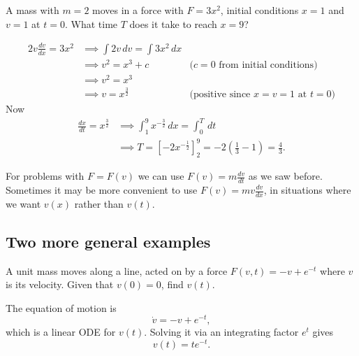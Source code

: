\documentclass[10pt, a4paper]{article}
\begin{document}
\begin{example}
    A mass with $m = 2$ moves in a force with $F = 3x ^ 2$,
    initial conditions $x = 1$ and $v = 1$ at $t = 0$.
    What time $T$ does it take to reach $x = 9$?

    \begin{solution}
        \begin{align*}
            2v\frac{dv}{dx} = 3x ^ 2 &\implies \int 2v\,dv = \int 3x ^ 2\,dx \\
            &\implies v ^ 2 = x ^ 3 + c &\text{($c = 0$ from initial conditions)} \\
            &\implies v ^ 2 = x ^ 3 \\
            &\implies v = x ^ {\frac{3}{2}} &\text{(positive since $x = v = 1$ at $t = 0$)}
        \end{align*}
        Now
        \begin{align*}
            \frac{dx}{dt} = x ^ {\frac{3}{2}} &\implies \int_{1}^{9} x ^ {-\frac{3}{2}}\,dx = \int_{0}^{T}\,dt \\
            &\implies T = \left[-2x ^ {-\frac{1}{2}}\right]_{2}^{9} = -2\left(\frac{1}{3} - 1\right) = \frac{4}{3}.
        \end{align*}
    \end{solution}
\end{example}

\begin{remark}
    For problems with $F = F(v)$ we can use $F(v) = m\frac{dv}{dt}$ as we saw before.
    Sometimes it may be more convenient to use $F(v) = mv\frac{dv}{dx}$,
    in situations where we want $v(x)$ rather than $v(t)$.
\end{remark}

\subsection{Two more general examples}

\begin{example}
    A unit mass moves along a line,
    acted on by a force $F(v, t) = -v + e ^ {-t}$ where $v$ is its velocity.
    Given that $v(0) = 0$,
    find $v(t)$.
    \begin{solution}
        The equation of motion is
        \[
        \dot{v} = -v + e ^ {-t},
        \]
        which is a linear ODE for $v(t)$.
        Solving it via an integrating factor $e ^ t$ gives
        \[
        v(t) = te ^ {-t}.
        \]
    \end{solution}
\end{example}
\end{document}

